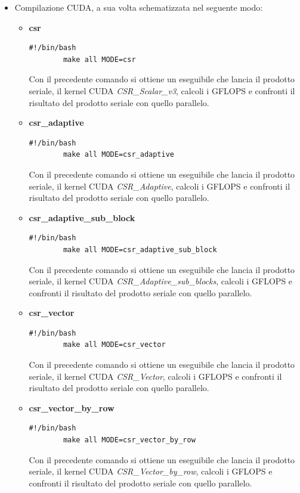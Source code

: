 \documentclass{article}
\begin{document}
\begin{itemize}
    \item Compilazione CUDA, a sua volta schematizzata nel seguente modo:
    \begin{itemize}
        \item \textbf{csr}
         \begin{lstlisting}[style=bashstyle]
        #!/bin/bash
        make all MODE=csr
        \end{lstlisting} Con il precedente comando si ottiene un eseguibile che lancia il prodotto seriale, il kernel CUDA \textit{CSR\_Scalar\_v3}, calcoli i GFLOPS e confronti il risultato del prodotto seriale con quello parallelo. 
        \item \textbf{csr\_adaptive}
          \begin{lstlisting}[style=bashstyle]
        #!/bin/bash
        make all MODE=csr_adaptive
        \end{lstlisting} Con il precedente comando si ottiene un eseguibile che lancia il prodotto seriale, il kernel CUDA \textit{CSR\_Adaptive}, calcoli i GFLOPS e confronti il risultato del prodotto seriale con quello parallelo. 
        \item \textbf{csr\_adaptive\_sub\_block}
        \begin{lstlisting}[style=bashstyle]
        #!/bin/bash
        make all MODE=csr_adaptive_sub_block
        \end{lstlisting} Con il precedente comando si ottiene un eseguibile che lancia il prodotto seriale, il kernel CUDA \textit{CSR\_Adaptive\_sub\_blocks}, calcoli i GFLOPS e confronti il risultato del prodotto seriale con quello parallelo. 
        \item \textbf{csr\_vector}
        \begin{lstlisting}[style=bashstyle]
        #!/bin/bash
        make all MODE=csr_vector
        \end{lstlisting} Con il precedente comando si ottiene un eseguibile che lancia il prodotto seriale, il kernel CUDA \textit{CSR\_Vector}, calcoli i GFLOPS e confronti il risultato del prodotto seriale con quello parallelo. 
        \item \textbf{csr\_vector\_by\_row}
        \begin{lstlisting}[style=bashstyle]
        #!/bin/bash
        make all MODE=csr_vector_by_row
        \end{lstlisting} Con il precedente comando si ottiene un eseguibile che lancia il prodotto seriale, il kernel CUDA \textit{CSR\_Vector\_by\_row}, calcoli i GFLOPS e confronti il risultato del prodotto seriale con quello parallelo. 

\end{itemize}
\end{itemize}
\end{document}
